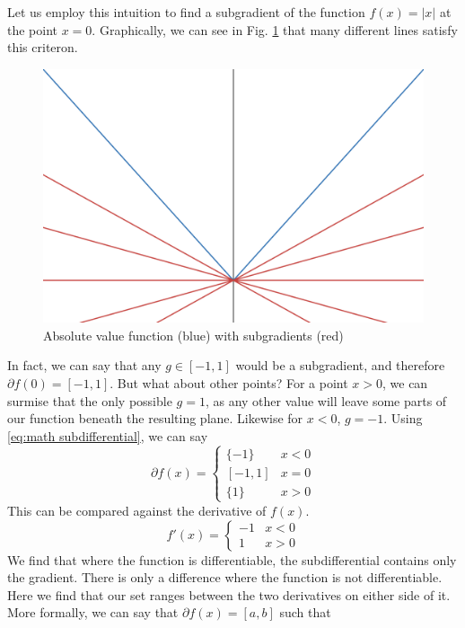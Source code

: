 \documentclass[conference]{IEEEtran}
\begin{document}
Let us employ this intuition to find a subgradient of the function \(f(x) = |x|\) at the point \(x=0\). Graphically, we can see in Fig. \ref{fig:abs subgradients} that many different lines satisfy this criteron.
\begin{figure}[tbp]
    \centering
    \includegraphics[width=\linewidth]{Figures/abs_subgradients.png}
    \caption{Absolute value function (blue) with subgradients (red)}
    \label{fig:abs subgradients}
\end{figure}
In fact, we can say that any \(g \in [-1,1]\) would be a subgradient, and therefore \(\partial f(0) = [-1,1]\). But what about other points? For a point \(x > 0\), we can surmise that the only possible \(g = 1\), as any other value will leave some parts of our function beneath the resulting plane. Likewise for \(x < 0\), \(g = -1\). Using \eqref{eq:math subdifferential}, we can say
\begin{equation}\label{eq:abs subdifferential}
\partial f(x) = \begin{cases}
    \{-1\} & x < 0 \\
    [-1, 1] & x = 0\\
    \{1\} & x > 0
\end{cases}
\end{equation}
This can be compared against the derivative of \(f(x)\).
\begin{equation}\label{eq:abs derivative}
f'(x) = \begin{cases}
            -1 & x < 0\\
            1 & x > 0
\end{cases}
\end{equation}
We find that where the function is differentiable, the subdifferential contains only the gradient. There is only a difference where the function is not differentiable. Here we find that our set ranges between the two derivatives on either side of it. More formally, we can say that \(\partial f(x) = [a, b]\) such that
\end{document}
